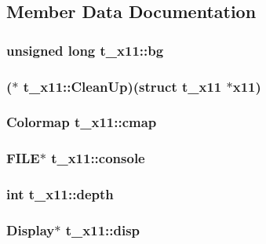 \subsection{\-Member \-Data \-Documentation}
\hypertarget{structt__x11_a93e4e1df05f860b62ac9bdbdd80bf695}{
\subsubsection[{bg}]{\setlength{\rightskip}{0pt plus 5cm}unsigned long {\bf t\-\_\-x11\-::bg}}}\label{structt__x11_a93e4e1df05f860b62ac9bdbdd80bf695}
\hypertarget{structt__x11_ace0cdeaecfcce2ce5849bc06605f2875}{
\subsubsection[{\-Clean\-Up}]{($\ast$ {\bf t\-\_\-x11\-::\-Clean\-Up})(struct {\bf t\-\_\-x11} $\ast$x11)}}\label{structt__x11_ace0cdeaecfcce2ce5849bc06605f2875}
\hypertarget{structt__x11_abb881fde5335821452d6e309d6c69893}{
\subsubsection[{cmap}]{\setlength{\rightskip}{0pt plus 5cm}\-Colormap {\bf t\-\_\-x11\-::cmap}}}\label{structt__x11_abb881fde5335821452d6e309d6c69893}
\hypertarget{structt__x11_ab8a0ae19197454df24a1f3722e665672}{
\subsubsection[{console}]{\setlength{\rightskip}{0pt plus 5cm}\-F\-I\-L\-E$\ast$ {\bf t\-\_\-x11\-::console}}}\label{structt__x11_ab8a0ae19197454df24a1f3722e665672}
\hypertarget{structt__x11_a5590b87c02702cb59e2d020d3d364292}{
\subsubsection[{depth}]{\setlength{\rightskip}{0pt plus 5cm}int {\bf t\-\_\-x11\-::depth}}}\label{structt__x11_a5590b87c02702cb59e2d020d3d364292}
\hypertarget{structt__x11_a281e044ea18dc7782936124bfdfac479}{
\subsubsection[{disp}]{\setlength{\rightskip}{0pt plus 5cm}\-Display$\ast$ {\bf t\-\_\-x11\-::disp}}}\label{structt__x11_a281e044ea18dc7782936124bfdfac479}
